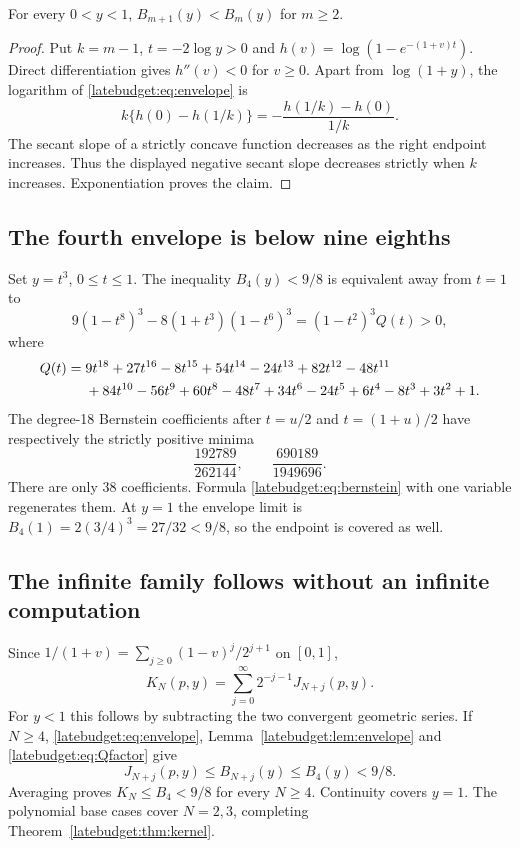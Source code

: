 \begin{lemma}\label{latebudget:lem:envelope}
For every $0<y<1$, $B_{m+1}(y)<B_m(y)$ for $m\ge2$.
\end{lemma}
\begin{proof}
Put $k=m-1$, $t=-2\log y>0$ and
$h(v)=\log(1-e^{-(1+v)t})$. Direct differentiation gives $h''(v)<0$ for $v\ge0$. Apart from $\log(1+y)$, the logarithm of \eqref{latebudget:eq:envelope} is
\[
 k\{h(0)-h(1/k)\}=-\frac{h(1/k)-h(0)}{1/k}.
\]
The secant slope of a strictly concave function decreases as the right endpoint increases. Thus the displayed negative secant slope decreases strictly when $k$ increases. Exponentiation proves the claim.
\end{proof}

\subsection{The fourth envelope is below nine eighths}
Set $y=t^3$, $0\le t\le1$. The inequality $B_4(y)<9/8$ is equivalent away from $t=1$ to
\begin{equation}\label{latebudget:eq:Qfactor}
9(1-t^8)^3-8(1+t^3)(1-t^6)^3=(1-t^2)^3Q(t)>0,
\end{equation}
where
\begin{align}\label{latebudget:eq:Q}
Q(t)={}&9t^{18}+27t^{16}-8t^{15}+54t^{14}-24t^{13}+82t^{12}
 -48t^{11}\notag\\
&+84t^{10}-56t^9+60t^8-48t^7+34t^6-24t^5
 +6t^4-8t^3+3t^2+1.
\end{align}
The degree-18 Bernstein coefficients after $t=u/2$ and $t=(1+u)/2$ have respectively the strictly positive minima
\begin{equation}\label{latebudget:eq:Qmin}
 \frac{192789}{262144},\qquad \frac{690189}{1949696}.
\end{equation}
There are only $38$ coefficients. Formula \eqref{latebudget:eq:bernstein} with one variable regenerates them. At $y=1$ the envelope limit is
$B_4(1)=2(3/4)^3=27/32<9/8$, so the endpoint is covered as well.

\subsection{The infinite family follows without an infinite computation}
Since $1/(1+v)=\sum_{j\ge0}(1-v)^j/2^{j+1}$ on $[0,1]$,
\begin{equation}\label{latebudget:eq:mixture}
 K_N(p,y)=\sum_{j=0}^{\infty}2^{-j-1}J_{N+j}(p,y).
\end{equation}
For $y<1$ this follows by subtracting the two convergent geometric series. If $N\ge4$, \eqref{latebudget:eq:envelope}, Lemma~\ref{latebudget:lem:envelope} and \eqref{latebudget:eq:Qfactor} give
\[
 J_{N+j}(p,y)\le B_{N+j}(y)\le B_4(y)<9/8.
\]
Averaging proves $K_N\le B_4<9/8$ for every $N\ge4$. Continuity covers $y=1$. The polynomial base cases cover $N=2,3$, completing Theorem~\ref{latebudget:thm:kernel}.


